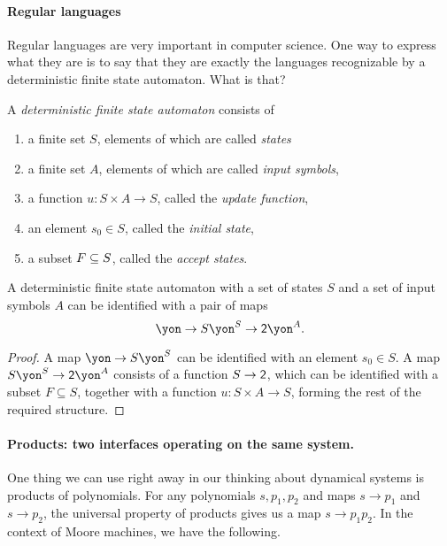 \documentclass[Book-Poly]{subfiles}
\begin{document}
\paragraph{Regular languages}

Regular languages are very important in computer science. One way to express what they are is to say that they are exactly the languages recognizable by a deterministic finite state automaton. What is that?

\begin{definition}\label{def.dfa}
A \emph{deterministic finite state automaton} consists of
\begin{enumerate}
	\item a finite set $S$, elements of which are called \emph{states}
	\item a finite set $A$, elements of which are called \emph{input symbols},
	\item a function $u\colon S\times A\to S$, called the \emph{update function},
	\item an element $s_0\in S$, called the \emph{initial state},
	\item a subset $F\ss S$, called the \emph{accept states}.
\end{enumerate}
\end{definition}

\begin{proposition}
A deterministic finite state automaton with a set of states $S$ and a set of input symbols $A$ can be identified with a pair of maps
\[
\yon\to S\yon^S\to \2\yon^A.
\]
\end{proposition}
\begin{proof}
A map $\yon\to S\yon^S$ can be identified with an element $s_0\in S$.
A map $S\yon^S\to\2\yon^A$ consists of a function $S\to\2$, which can be identified with a subset $F \subseteq S$, together with a function $u \colon S\times A\to S$, forming the rest of the required structure.
\end{proof}

\paragraph{Products: two interfaces operating on the same system.}

One thing we can use right away in our thinking about dynamical systems is products of polynomials.
For any polynomials $s,p_1,p_2$ and maps $s\to p_1$ and $s\to p_2$, the universal property of products gives us a map $s\to p_1p_2$. In the context of Moore machines, we have the following.
\end{document}
